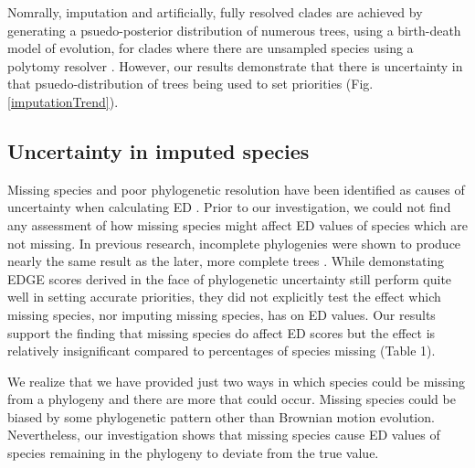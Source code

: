 \documentclass[12pt,english]{article}
\begin{document}
Nomrally, imputation and artificially, fully resolved clades are achieved by
generating a psuedo-posterior distribution of numerous trees, using a
birth-death model of evolution, for clades where there are unsampled species
using a polytomy resolver \autocite{Kuhn2011}. However, our results demonstrate
that there is uncertainty in that psuedo-distribution of trees being used to set
priorities (Fig. \ref{imputationTrend}).

\subsection*{Uncertainty in imputed species}
Missing species and poor phylogenetic resolution have been identified as causes
of uncertainty when calculating ED \autocite{Isaac2007}. Prior to our
investigation, we could not find any assessment of how missing species might
affect ED values of species which are not missing. In previous research,
incomplete phylogenies were shown to produce nearly the same result as the
later, more complete trees \autocite{Curnick2015}. While demonstating EDGE
scores derived in the face of phylogenetic uncertainty still perform quite well
in setting accurate priorities, they did not explicitly test the effect which
missing species, nor imputing missing species, has on ED values. Our results
support the finding that missing species do affect ED scores but the effect is
relatively insignificant compared to percentages of species missing (Table 1). 


We realize that we have provided just two ways in which species could be missing
from a phylogeny and there are more that could occur. Missing species could be
biased by some phylogenetic pattern other than Brownian motion evolution.
Nevertheless, our investigation shows that missing species cause ED values of
species remaining in the phylogeny to deviate from the true value.
\end{document}
